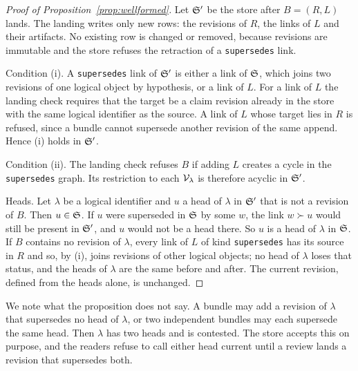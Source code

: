 \begin{proof}[Proof of Proposition~\ref{prop:wellformed}]\label{proof:prop:wellformed}
Let $\mathfrak{S}'$ be the store after $B=(R,L)$ lands. The landing writes only new rows: the revisions of $R$, the links of $L$ and their artifacts. No existing row is changed or removed, because revisions are immutable and the store refuses the retraction of a \texttt{supersedes} link.

Condition (i). A \texttt{supersedes} link of $\mathfrak{S}'$ is either a link of $\mathfrak{S}$, which joins two revisions of one logical object by hypothesis, or a link of $L$. For a link of $L$ the landing check requires that the target be a claim revision already in the store with the same logical identifier as the source. A link of $L$ whose target lies in $R$ is refused, since a bundle cannot supersede another revision of the same append. Hence (i) holds in $\mathfrak{S}'$.

Condition (ii). The landing check refuses $B$ if adding $L$ creates a cycle in the \texttt{supersedes} graph. Its restriction to each $\mathcal{V}_\lambda$ is therefore acyclic in $\mathfrak{S}'$.

Heads. Let $\lambda$ be a logical identifier and $u$ a head of $\lambda$ in $\mathfrak{S}'$ that is not a revision of $B$. Then $u\in\mathfrak{S}$. If $u$ were superseded in $\mathfrak{S}$ by some $w$, the link $w\succ u$ would still be present in $\mathfrak{S}'$, and $u$ would not be a head there. So $u$ is a head of $\lambda$ in $\mathfrak{S}$. If $B$ contains no revision of $\lambda$, every link of $L$ of kind \texttt{supersedes} has its source in $R$ and so, by (i), joins revisions of other logical objects; no head of $\lambda$ loses that status, and the heads of $\lambda$ are the same before and after. The current revision, defined from the heads alone, is unchanged.
\end{proof}

We note what the proposition does not say. A bundle may add a revision of $\lambda$ that supersedes no head of $\lambda$, or two independent bundles may each supersede the same head. Then $\lambda$ has two heads and is contested. The store accepts this on purpose, and the readers refuse to call either head current until a review lands a revision that supersedes both.


